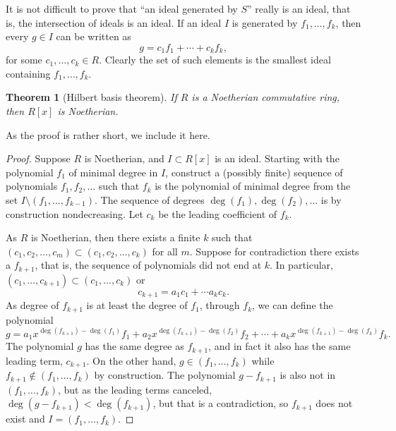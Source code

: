 \documentclass[12pt,openany]{book}
\theoremstyle{plain}
\newtheorem{thm}{Theorem}[section]
\theoremstyle{remark}
\theoremstyle{definition}
\theoremstyle{exercise}
\theoremstyle{example}
\begin{document}
It is not difficult to prove that ``an ideal generated by $S$'' really is
an ideal, that is, the intersection of ideals is an ideal.
If an ideal $I$ is generated by $f_1,\ldots,f_k$, then every
$g \in I$ can be written as
\begin{equation*}
g = c_1 f_1 + \cdots + c_k f_k,
\end{equation*}
for some $c_1,\ldots,c_k \in R$.  Clearly the set of such elements is
the smallest ideal containing $f_1,\ldots,f_k$.

\begin{thm}[Hilbert basis theorem] \label{thm:hilbertbasis}
%
If $R$ is a Noetherian commutative ring, then $R[x]$ is Noetherian.
\end{thm}

As the proof is rather short, we include it here.

\begin{proof}
Suppose $R$ is Noetherian, and
$I \subset R[x]$ is an ideal.
Starting with the polynomial $f_1$ of minimal degree in $I$,
construct a (possibly finite) sequence of polynomials $f_1,f_2,\ldots$
such that $f_k$ is the polynomial of minimal degree
from the set $I \setminus (f_1,\ldots,f_{k-1})$.
The sequence of degrees $\deg(f_1),\deg(f_2),\ldots$ is by construction
nondecreasing.
Let $c_k$ be the leading coefficient of $f_k$.

As $R$ is Noetherian, then there exists a finite $k$ such
that $(c_1,c_2,\ldots,c_m) \subset (c_1,c_2,\ldots,c_k)$ for all $m$.
Suppose for contradiction there exists a $f_{k+1}$, that is, the sequence
of polynomials
did not end at $k$.  In particular,
$(c_1,\ldots,c_{k+1}) \subset (c_1,\ldots,c_k)$ or
\begin{equation*}
c_{k+1} = a_1 c_1 + \cdots a_k c_k .
\end{equation*}
As degree of $f_{k+1}$ is at least the degree of $f_1$, through $f_k$,
we can define the polynomial
\begin{equation*}
g =
a_1 x^{\deg(f_{k+1})-\deg(f_1)} f_1
+
a_2 x^{\deg(f_{k+1})-\deg(f_2)} f_2
+
\cdots
+
a_k x^{\deg(f_{k+1})-\deg(f_k)} f_k .
\end{equation*}
The polynomial $g$ has the same degree as $f_{k+1}$,
and in fact it also has the same leading term,
$c_{k+1}$.  On the other hand, $g \in (f_1,\ldots,f_{k})$ while
$f_{k+1} \notin (f_1,\ldots,f_k)$ by construction.  The polynomial
$g-f_{k+1}$ is also not in
$(f_1,\ldots,f_k)$, but as the leading terms canceled,
$\deg(g-f_{k+1}) < \deg(f_{k+1})$, but that is a contradiction, so $f_{k+1}$
does not exist and
$I = (f_1,\ldots,f_k)$.
\end{proof}
\end{document}
